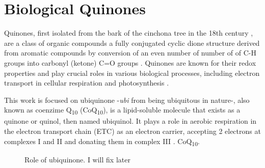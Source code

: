 \section{Biological Quinones}
Quinones, first isolated from the bark of the cinchona tree in the 18th century \cite{rusell1873quinone}, are a class of organic compounds a fully conjugated cyclic dione structure derived from aromatic compounds by conversion of an even number of number of of C-H groups into carbonyl (ketone) C=O groups \cite{IUPACQ050152025}. Quinones are known for their redox properties and play crucial roles in various biological processes, including electron transport in cellular respiration and photosynthesis \cite{ernster1995biochemical,chen2024low}.

This work is focused on ubiquinone -\textit{ubi} from being ubiquitous in nature-, also known as coenzime Q\textsubscript{10} (CoQ\textsubscript{10}), is a lipid-soluble molecule that exists as a quinone or quinol, then named ubiquinol. It plays a role in aerobic respiration in the electron transport chain (ETC) as an electron carrier, accepting 2 electrons at complexes I and II and donating them in complex III \cite{ernster1995biochemical}. CoQ\textsubscript{10}.

\begin{figure}[h]
  \centering
  \caption[Role of ubiquinone]{Role of ubiquinone. I will fix later}
  \label{fig:QuinoneTypes}
\end{figure}

